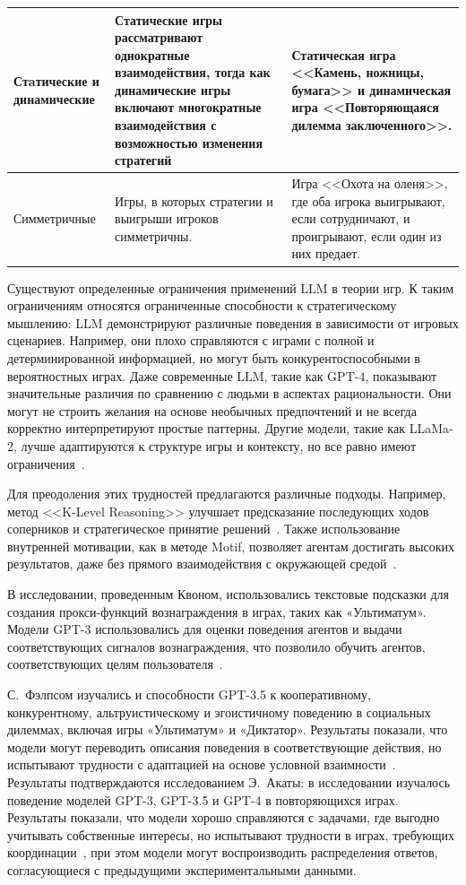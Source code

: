 \begin{longtable}[c]{|p{}|p{}|p{}|}
Стa\-ти\-чес\-кие и ди\-на\-ми\-чес\-кие & Статические игры рассматривают однократные взаимодействия, тогда как динамические игры включают многократные взаимодействия с возможностью изменения стратегий & Статическая игра <<Камень, ножницы, бумага>> и динамическая игра <<Повторяющаяся дилемма заключенного>>.\\ \hline

Симметричные & Игры, в которых стратегии и выигрыши игроков симметричны. & Игра <<Охота на оленя>>, где оба игрока выигрывают, если сотрудничают, и проигрывают, если один из них предает.  \\ \hline

\end{longtable}

Существуют определенные ограничения применений LLM в теории игр. К таким ограничениям относятся ограниченные способности к стратегическому мышлению: LLM демонстрируют различные поведения в зависимости от игровых сценариев. Например, они плохо справляются с играми с полной и детерминированной информацией, но могут быть конкурентоспособными в вероятностных играх.  Даже современные LLM, такие как GPT-4, показывают значительные различия по сравнению с людьми в аспектах рациональности. Они могут не строить желания на основе необычных предпочтений и не всегда корректно интерпретируют простые паттерны.  Другие модели, такие как LLaMa-2, лучше адаптируются к структуре игры и контексту, но все равно имеют ограничения~\cite{duan2024gtbench}.

Для преодоления этих трудностей предлагаются различные подходы. Например, метод <<K-Level Reasoning>> улучшает предсказание последующих ходов соперников и стратегическое принятие решений~\cite{zhang2024klevel}. Также использование внутренней мотивации, как в методе Motif, позволяет агентам достигать высоких результатов, даже без прямого взаимодействия с окружающей средой~\cite{klissarov2023motif}.

В исследовании, проведенным Квоном, использовались текстовые подсказки для создания прокси-функций вознаграждения в играх, таких как «Ультиматум». Модели GPT-3 использовались для оценки поведения агентов и выдачи соответствующих сигналов вознаграждения, что позволило обучить агентов, соответствующих целям пользователя~\cite{kwon2023reward}. 

С.~Фэлпсом изучались и способности GPT-3.5 к кооперативному, конкурентному, альтруистическому и эгоистичному поведению в социальных дилеммах, включая игры «Ультиматум» и «Диктатор». Результаты показали, что модели могут переводить описания поведения в соответствующие действия, но испытывают трудности с адаптацией на основе условной взаимности~\cite{phelps2023investigating}. Результаты подтверждаются исследованием Э.~Акаты: в исследовании изучалось поведение моделей GPT-3, GPT-3.5 и GPT-4 в повторяющихся играх. Результаты показали, что модели хорошо справляются с задачами, где выгодно учитывать собственные интересы, но испытывают трудности в играх, требующих координации~\cite{akata2023playing}, при этом модели могут воспроизводить распределения ответов, согласующиеся с предыдущими экспериментальными данными.

